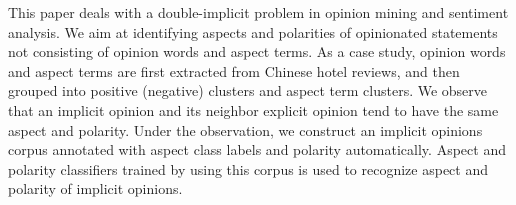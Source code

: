 This paper deals with a double-implicit problem in opinion mining and sentiment analysis. We aim at identifying aspects and polarities of opinionated statements not consisting of opinion words and aspect terms. As a case study, opinion words and aspect terms are first extracted from Chinese hotel reviews, and then grouped into positive (negative) clusters and aspect term clusters. We observe that an implicit opinion and its neighbor explicit opinion tend to have the same aspect and polarity. Under the observation, we construct an implicit opinions corpus annotated with aspect class labels and polarity automatically. Aspect and polarity classifiers trained by using this corpus is used to recognize aspect and polarity of implicit opinions.
